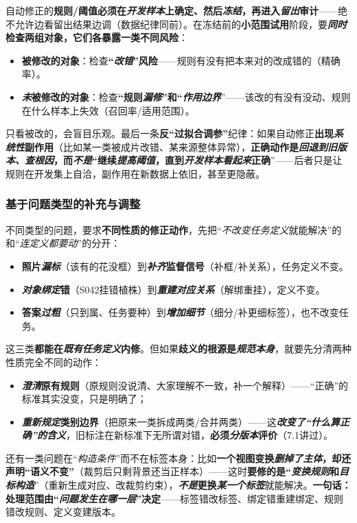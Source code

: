自动修正的\textbf{规则/阈值必须在\emph{开发样本}上确定、然后\emph{冻结}，再进入\emph{留出}审计}——绝不允许边看留出结果边调（数据纪律同前）。在冻结前的\textbf{小范围试用}阶段，要\textbf{\emph{同时}检查两组对象，它们各暴露一类不同风险}：
\begin{itemize}\item \textbf{被修改的对象}：检查\textbf{“\emph{改错}”风险}——规则有没有把本来对的改成错的（精确率）。\item \textbf{\emph{未}被修改的对象}：检查\textbf{“规则\emph{漏修}”和“\emph{作用边界}}”——该改的有没有没动、规则在什么样本上失效（召回率/适用范围）。\end{itemize}
只看被改的，会盲目乐观。最后一条\textbf{反“过拟合调参”}纪律：如果自动修正\textbf{出现\emph{系统性}副作用}（比如某一类被成片改错、某来源整体异常），\textbf{正确动作是\emph{回退到旧版本、查根因}，而\emph{不是}“继续\emph{提高阈值}，直到\emph{开发样本看起来}正确}”——后者只是让规则在开发集上自洽，副作用在新数据上依旧，甚至更隐蔽。

\subsubsection{基于问题类型的补充与调整}
\label{sec:knowledge-quality-assessment-correction-type-repair}

不同类型的问题，要求\textbf{不同性质的修正动作}，先把“\emph{不改变任务定义}就能解决”的和“\emph{连定义都要动}”的分开：
\begin{itemize}\item \textbf{照片\emph{漏标}}（该有的花没框）到\textbf{\emph{补齐}监督信号}（补框/补关系），任务定义不变。\item \textbf{\emph{对象绑定}错}（S042挂错植株）到\textbf{\emph{重建对应关系}}（解绑重挂），定义不变。\item \textbf{答案\emph{过粗}}（只到属、任务要种）到\textbf{\emph{增加细节}}（细分/补更细标签），也不改变任务。\end{itemize}
这三类\textbf{都能在\emph{既有任务定义}内修}。但如果\textbf{歧义的根源是\emph{规范本身}}，就要先分清两种性质完全不同的动作：
\begin{itemize}\item \textbf{\emph{澄清}原有规则}（原规则没说清、大家理解不一致，补一个解释）——“正确”的标准其实没变，只是明确了；\item \textbf{\emph{重新规定}类别边界}（把原来一类拆成两类/合并两类）——这\textbf{\emph{改变了“什么算正确”的含义}}，旧标注在新标准下无所谓对错，\textbf{必须\emph{分版本}评价}（7.1讲过）。\end{itemize}
还有一类问题在“\emph{构造条件}”而不在标签本身：比如\textbf{一个视图变换\emph{删掉了主体}，却还声明“语义不变”}（裁剪后只剩背景还当正样本）——这时\textbf{要修的是“\emph{变换规则}和\emph{目标构造}}”（重新生成对应、改裁剪约束），\textbf{\emph{不是}更换\emph{某一个标签}}就能解决。\textbf{一句话：处理范围由“\emph{问题发生在\emph{哪一层}}”决定}——标签错改标签、绑定错重建绑定、规则错改规则、定义变建版本。

